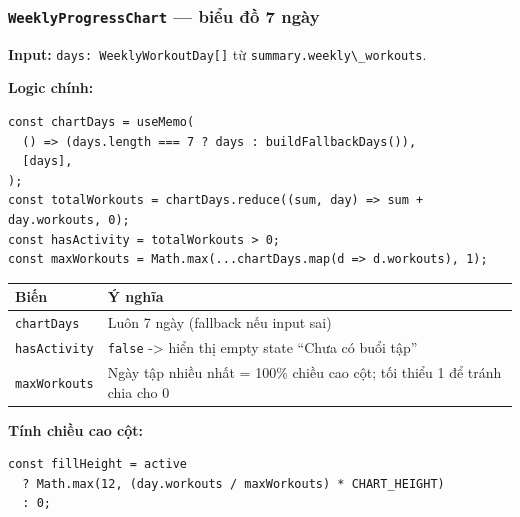 \documentclass[12pt,a4paper]{article}
\newcounter{none}
\providecommand{\passthrough}[1]{#1}
\begin{document}
\subsubsection{\texorpdfstring{\texttt{WeeklyProgressChart} --- biểu đồ
7
ngày}{WeeklyProgressChart --- biểu đồ 7 ngày}}\label{weeklyprogresschart-biux1ec3u-ux111ux1ed3-7-nguxe0y}

\textbf{Input:} \passthrough{\lstinline!days: WeeklyWorkoutDay[]!} từ
\passthrough{\lstinline!summary.weekly\_workouts!}.

\textbf{Logic chính:}

\begin{lstlisting}
const chartDays = useMemo(
  () => (days.length === 7 ? days : buildFallbackDays()),
  [days],
);
const totalWorkouts = chartDays.reduce((sum, day) => sum + day.workouts, 0);
const hasActivity = totalWorkouts > 0;
const maxWorkouts = Math.max(...chartDays.map(d => d.workouts), 1);

\end{lstlisting}

{\def\LTcaptype{none} %
\begin{longtable}[]{@{}
  >{\raggedright\arraybackslash}p{}
  >{\raggedright\arraybackslash}p{}@{}}
\toprule\noalign{}
\begin{minipage}[b]{\linewidth}\raggedright
Biến
\end{minipage} & \begin{minipage}[b]{\linewidth}\raggedright
Ý nghĩa
\end{minipage} \\
\midrule\noalign{}
\endhead
\bottomrule\noalign{}
\endlastfoot
\passthrough{\lstinline!chartDays!} & Luôn 7 ngày (fallback nếu input
sai) \\
\passthrough{\lstinline!hasActivity!} & \passthrough{\lstinline!false!}
-\textgreater{} hiển thị empty state ``Chưa có buổi tập'' \\
\passthrough{\lstinline!maxWorkouts!} & Ngày tập nhiều nhất = 100\%
chiều cao cột; tối thiểu 1 để tránh chia cho 0 \\
\end{longtable}
}

\textbf{Tính chiều cao cột:}

\begin{lstlisting}
const fillHeight = active
  ? Math.max(12, (day.workouts / maxWorkouts) * CHART_HEIGHT)
  : 0;

\end{lstlisting}
\end{document}
